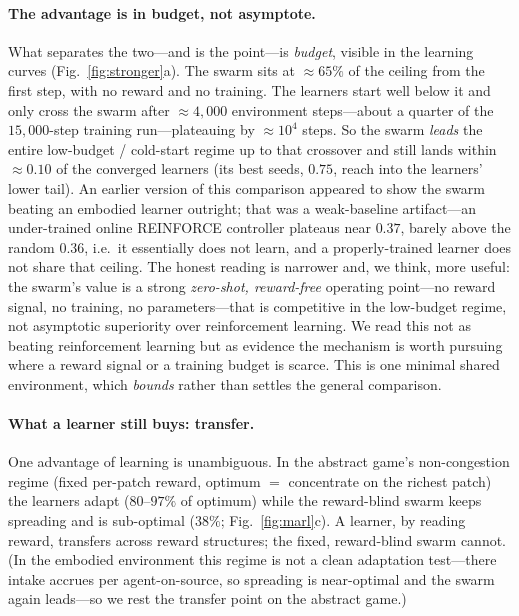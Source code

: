 \documentclass{article}
\begin{document}
\paragraph{The advantage is in budget, not asymptote.} What separates the two---and is the point---is
\emph{budget}, visible in the learning curves (Fig.~\ref{fig:stronger}a). The swarm sits at ${\approx}65\%$ of
the ceiling from the first step, with no reward and no training. The learners start well below it and only
cross the swarm after ${\approx}4{,}000$ environment steps---about a quarter of the $15{,}000$-step training
run---plateauing by ${\approx}10^{4}$ steps. So the swarm \emph{leads} the entire low-budget / cold-start regime
up to that crossover and still lands within ${\approx}0.10$ of the converged learners (its best seeds, $0.75$,
reach into the learners' lower tail). An earlier version of this comparison appeared to show the swarm beating an embodied
learner outright; that was a weak-baseline artifact---an under-trained online REINFORCE controller plateaus
near $0.37$, barely above the random $0.36$, i.e.\ it essentially does not learn, and a properly-trained
learner does not share that ceiling. The honest reading is narrower and, we think, more useful: the swarm's
value is a strong \emph{zero-shot, reward-free} operating point---no reward signal, no training, no
parameters---that is competitive in the low-budget regime, not asymptotic superiority over reinforcement
learning. We read this not as beating reinforcement learning but as evidence the mechanism is worth pursuing
where a reward signal or a training budget is scarce. This is one minimal shared environment, which
\emph{bounds} rather than settles the general comparison.

\paragraph{What a learner still buys: transfer.} One advantage of learning is unambiguous. In the abstract
game's non-congestion regime (fixed per-patch reward, optimum $=$ concentrate on the richest patch) the
learners adapt ($80$--$97\%$ of optimum) while the reward-blind swarm keeps spreading and is sub-optimal
($38\%$; Fig.~\ref{fig:marl}c). A learner, by reading reward, transfers across reward structures; the fixed,
reward-blind swarm cannot. (In the embodied environment this regime is not a clean adaptation test---there
intake accrues per agent-on-source, so spreading is near-optimal and the swarm again leads---so we rest the
transfer point on the abstract game.)
\end{document}
